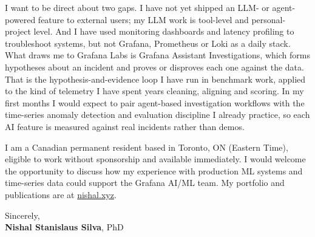 \documentclass[11pt]{article}
\newcommand{\clName}{Nishal Stanislaus Silva}
\newcommand{\clCity}{Toronto, ON}
\newcommand{\clSite}{https://nishal.xyz}
\begin{document}
I want to be direct about two gaps. I have not yet shipped an LLM- or agent-powered feature to external users; my LLM work is tool-level and personal-project level. And I have used monitoring dashboards and latency profiling to troubleshoot systems, but not Grafana, Prometheus or Loki as a daily stack. What draws me to Grafana Labs is Grafana Assistant Investigations, which forms hypotheses about an incident and proves or disproves each one against the data. That is the hypothesis-and-evidence loop I have run in benchmark work, applied to the kind of telemetry I have spent years cleaning, aligning and scoring. In my first months I would expect to pair agent-based investigation workflows with the time-series anomaly detection and evaluation discipline I already practice, so each AI feature is measured against real incidents rather than demos.

I am a Canadian permanent resident based in \clCity{} (Eastern Time), eligible to work without sponsorship and available immediately. I would welcome the opportunity to discuss how my experience with production ML systems and time-series data could support the Grafana AI/ML team. My portfolio and publications are at \href{\clSite}{nishal.xyz}.

\vspace{10pt}
Sincerely,\\[2pt]
\textbf{\clName}, PhD
\end{document}
